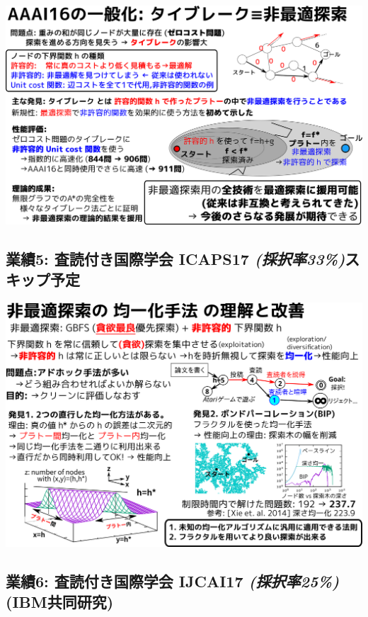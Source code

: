 \includegraphics{img/jair17.png}

\subsection[業績5: 査読付き国際学会 ICAPS17 \textbf{\emph{(採択率33\%)}}]{業績5: 査読付き国際学会 ICAPS17 \textbf{\emph{(採択率33\%)}}\hfill{}\textsc{スキップ予定}}
\label{sec:orgheadline24}

\includegraphics{img/icaps17.png}

\subsection{業績6: 査読付き国際学会 IJCAI17 \textbf{\emph{(採択率25\%)}} \textbf{(IBM共同研究)}}
\label{sec:orgheadline25}

